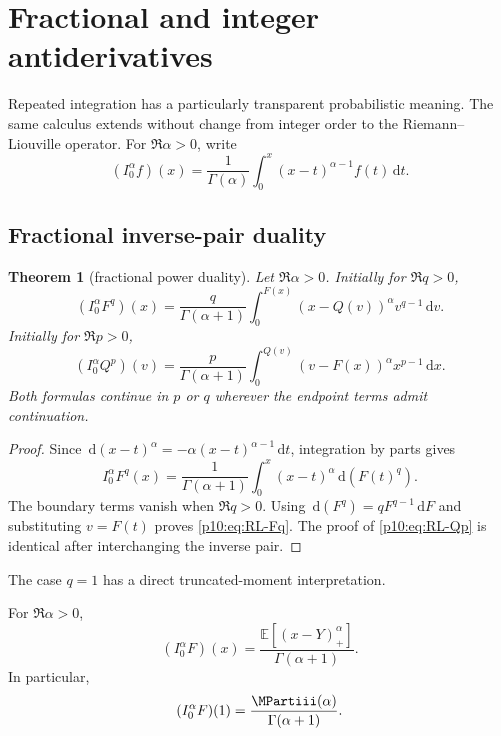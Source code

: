 \documentclass[11pt,oneside]{article}
\newtheorem{theorem}{Theorem}[section]
\theoremstyle{definition}
\theoremstyle{remark}
\newcommand{\F}{F}
\newcommand{\Q}{Q}
\newcommand{\E}{\mathbb E}
\newcommand{\dd}{\,\mathrm d}
\newcommand{\1}{\mathbf 1}
\begin{document}
\section{Fractional and integer antiderivatives}

Repeated integration has a particularly transparent probabilistic meaning.  The same
calculus extends without change from integer order to the Riemann--Liouville operator.
For \(\Re\alpha>0\), write
\begin{equation}\label{p10:eq:RLdef}
 (I_0^\alpha f)(x)
 =\frac1{\Gamma(\alpha)}\int_0^x(x-t)^{\alpha-1}f(t)\dd t.
\end{equation}

\subsection{Fractional inverse-pair duality}

\begin{theorem}[fractional power duality]\label{p10:thm:fractional-duality}
Let \(\Re\alpha>0\).  Initially for \(\Re q>0\),
\begin{equation}\label{p10:eq:RL-Fq}
 (I_0^\alpha\F^q)(x)
 =\frac{q}{\Gamma(\alpha+1)}
 \int_0^{\F(x)}(x-\Q(v))^\alpha v^{q-1}\dd v.
\end{equation}
Initially for \(\Re p>0\),
\begin{equation}\label{p10:eq:RL-Qp}
 (I_0^\alpha\Q^p)(v)
 =\frac{p}{\Gamma(\alpha+1)}
 \int_0^{\Q(v)}(v-\F(x))^\alpha x^{p-1}\dd x.
\end{equation}
Both formulas continue in \(p\) or \(q\) wherever the endpoint terms admit continuation.
\end{theorem}

\begin{proof}
Since \(\dd(x-t)^\alpha=-\alpha(x-t)^{\alpha-1}\dd t\), integration by parts gives
\[
 I_0^\alpha\F^q(x)
 =\frac1{\Gamma(\alpha+1)}
 \int_0^x(x-t)^\alpha\dd(\F(t)^q).
\]
The boundary terms vanish when \(\Re q>0\).  Using
\(\dd(\F^q)=q\F^{q-1}\dd\F\) and substituting \(v=\F(t)\) proves
\cref{p10:eq:RL-Fq}.  The proof of \cref{p10:eq:RL-Qp} is identical after interchanging the
inverse pair.
\end{proof}

The case \(q=1\) has a direct truncated-moment interpretation.

\begin{corollary}\label{p10:cor:RL-F-prob}
For \(\Re\alpha>0\),
\begin{equation}\label{p10:eq:RL-F-prob}
 (I_0^\alpha\F)(x)
 =\frac{\E[(x-Y)_+^\alpha]}{\Gamma(\alpha+1)}.
\end{equation}
In particular,
\begin{equation}\label{p10:eq:RL-F-at-one}
 (I_0^\alpha\F)(1)
 =\frac{\MPartiii(\alpha)}{\Gamma(\alpha+1)}.
\end{equation}
\end{corollary}
\end{document}
